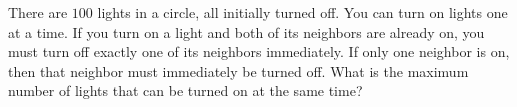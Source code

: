 There are $100$ lights in a circle, all initially turned off. You can turn on lights one at a time. If you turn on a light and both of its neighbors are already on, you must turn off exactly one of its neighbors immediately. If only one neighbor is on, then that neighbor must immediately be turned off. What is the maximum number of lights that can be turned on at the same time?
